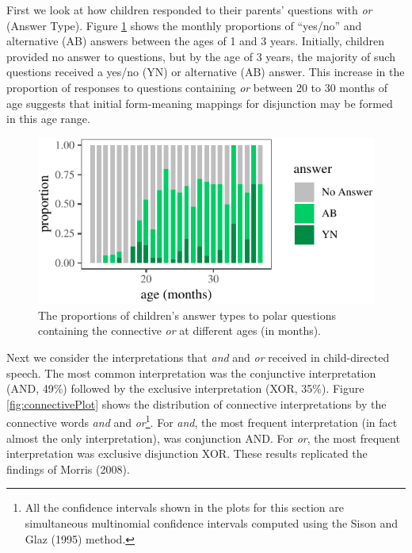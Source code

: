 \documentclass[floatsintext,man]{apa6}
\theoremstyle{definition}
\theoremstyle{definition}
\theoremstyle{definition}
\theoremstyle{remark}
\begin{document}
First we look at how children responded to their parents' questions with
\emph{or} (Answer Type). Figure \ref{fig:answerPlot} shows the monthly
proportions of \enquote{yes/no} and alternative (AB) answers between the
ages of 1 and 3 years. Initially, children provided no answer to
questions, but by the age of 3 years, the majority of such questions
received a yes/no (YN) or alternative (AB) answer. This increase in the
proportion of responses to questions containing \emph{or} between 20 to
30 months of age suggests that initial form-meaning mappings for
disjunction may be formed in this age range.

\begin{figure}[tb]

{\centering \includegraphics{figs/answerPlot-1} 

}

\caption{The proportions of children's answer types to polar questions containing the connective \textit{or} at different ages (in months).}\label{fig:answerPlot}
\end{figure}

Next we consider the interpretations that \emph{and} and \emph{or}
received in child-directed speech. The most common interpretation was
the conjunctive interpretation (AND, 49\%) followed by the exclusive
interpretation (XOR, 35\%). Figure \ref{fig:connectivePlot} shows the
distribution of connective interpretations by the connective words
\emph{and} and \emph{or}\footnote{All the confidence intervals shown in
  the plots for this section are simultaneous multinomial confidence
  intervals computed using the Sison and Glaz (1995) method.}. For
\emph{and}, the most frequent interpretation (in fact almost the only
interpretation), was conjunction AND. For \emph{or}, the most frequent
interpretation was exclusive disjunction XOR. These results replicated
the findings of Morris (2008).
\end{document}
